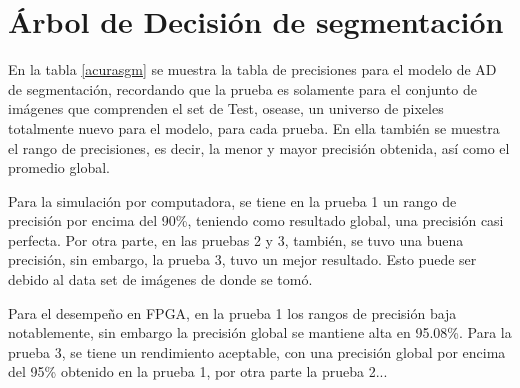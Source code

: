 \documentclass[twoside,spanish,ESP,MSc]{plantillaLabUPV}
\theoremstyle{definition}
\begin{document}
\section{Árbol de Decisión de segmentación}

En la tabla \ref{acurasgm} se muestra la tabla de precisiones para el modelo de AD de segmentación, recordando que la prueba es solamente para el conjunto de imágenes que comprenden el set de Test, osease, un universo de pixeles totalmente nuevo para el modelo, para cada prueba. En ella también se muestra el rango de precisiones, es decir, la menor y mayor precisión obtenida, así como el promedio global.  


Para la simulación por computadora, se tiene en la prueba 1 un rango de precisión por encima del 90\%, teniendo como resultado global, una precisión casi perfecta. Por otra parte, en las pruebas 2 y 3, también, se tuvo una buena precisión, sin embargo, la prueba 3, tuvo un mejor resultado. Esto puede ser debido al data set de imágenes de donde se tomó.  

Para el desempeño en FPGA, en la prueba 1 los rangos de precisión baja notablemente, sin embargo la precisión global se mantiene alta en 95.08\%. Para la prueba 3, se tiene un rendimiento aceptable, con una precisión global por encima del 95\% obtenido en la prueba 1, por otra parte la prueba 2...
\end{document}
